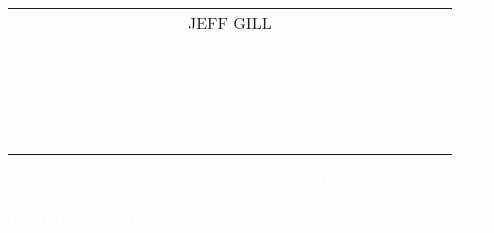 \documentclass[12pt]{article}
\newcommand{\9}{\\[9pt]}
\begin{document}
\begin{landscape}
\pagecolor{black}

	\newenvironment{ohlist}
	    { \begin{list}{$\blacktriangleright$}{\setlength{\itemsep}{10pt}} }
	    { \end{list} }
	\newenvironment{ohlistsmall}
	    { \begin{list}{$\blacktriangleright$}{\setlength{\itemsep}{1pt}} }
	    { \end{list} }
	\newenvironment{ohlist2}
	    { \begin{list}{$\triangleright$}{\setlength{\itemsep}{8pt}} }
	    { \end{list} }
	\newenvironment{ohlist3}
	    { \begin{list}{$\triangleright$}{\setlength{\itemsep}{1pt}} }
	    { \end{list} }

\begin{titlepage}
\begin{center}\begin{huge}
\\[0.5in]
\end{huge}
\begin{Large}
\parbox{\linewidth}{  \begin{center} \begin{tabular}{c}
    \textcolor{MyGreen}{JEFF GILL}  \\
    {\bf \textcolor{white}{\em Distinguished Professor, Department of Government} }\\
    {\bf \textcolor{white}{\em Professor, Department Mathematics \& Statistics} }\\
    {\bf \textcolor{white}{\em Member, Center for Behavioral Neuroscience} }\\
    {\bf \textcolor{white}{\em American University} }\\[2.2in]
\end{tabular} \end{center} }
\end{Large} %
\end{center}
    {\bf \textcolor{white}{\large $\ddagger$ Supported by Eunice Kennedy Shriver National Institute of Child Health \& Human Development (NIH)
            Grant Number: 1R21HD086784-01A1.} }\\
\pagestyle{empty}
\end{titlepage}


\end{landscape}
\end{document}

